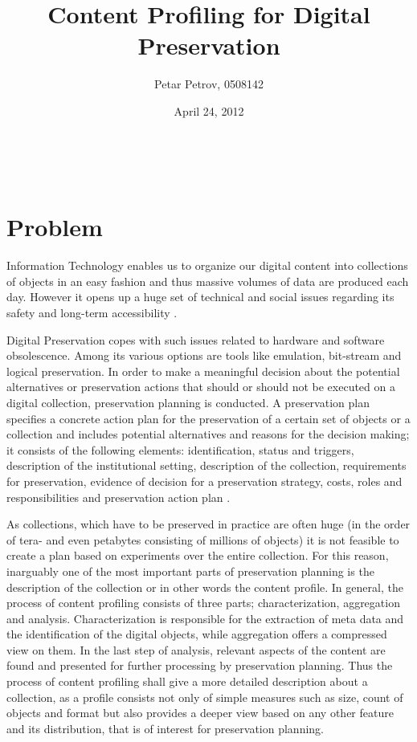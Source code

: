 \documentclass[a4paper,12pt]{scrartcl} %
\title{Content Profiling for Digital Preservation}
\author{Petar Petrov, 0508142}
\date{April 24, 2012}
\makeatletter
\renewcommand{\maketitle}{\begingroup
    \let\footnotesize\small
    \let\footnoterule\relax
    \parindent \z@
    \reset@font
    \vskip 1\p@
    \begin{flushleft}
      \LARGE
      \strut\@title
    \end{flushleft}
    \@author \\
    \@date
    \vskip 40\p@
  \endgroup
  \setcounter{footnote}{0}%
}
\makeatother
\begin{document}
\maketitle

\section*{Problem}
Information Technology enables us to organize our digital content into collections of objects in an easy fashion and thus massive volumes of data are produced each day.
However it opens up a huge set of technical and social issues regarding its safety and long-term accessibility \cite{Lorie:2001:LTP:379437.379726}.

Digital Preservation copes with such issues related to hardware and software obsolescence. Among its various
options are tools like emulation, bit-stream and logical preservation. In order to make a meaningful decision
about the potential alternatives or preservation actions that should or should not be executed on a
digital collection, preservation planning is conducted. A preservation plan specifies a concrete action plan for the preservation
of a certain set of objects or a collection and includes potential alternatives and reasons for the decision making; it
consists of the following elements: identification, status and triggers, description of the institutional setting, description of the collection, requirements for preservation, evidence of decision for a preservation strategy, costs, roles and responsibilities and preservation action plan \cite{Becker:2009fk}. 

As collections, which have to be preserved in practice are often huge (in the order of tera- and even petabytes consisting of millions of objects) it is not feasible to create a plan based on experiments over the entire collection. For this reason, inarguably one of the most important parts of preservation planning is the description of the collection or in other words the content profile. In general, the process of content profiling consists of three parts; characterization, aggregation and analysis. Characterization is responsible for the extraction of meta data and the identification of the digital objects, while aggregation offers a compressed view on them. In the last step of analysis, relevant aspects of the content are found and presented for further processing by preservation planning. Thus the process of content profiling shall give a more detailed description about a collection, as a profile consists not only of simple measures such as size, count of objects and format but also provides a deeper view based on any other feature and its distribution, that is of interest for preservation planning.
\end{document}

